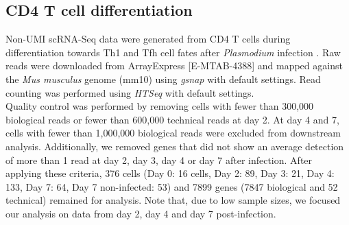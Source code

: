 \subsection{CD4\plus{} T cell differentiation} \label{seq::data_cd4diff}
Non-UMI scRNA-Seq data were generated from CD4\plus{} T cells during differentiation towards Th1 and Tfh cell fates after \emph{Plasmodium} infection \citep{Lonnberg2017}. Raw reads were downloaded from ArrayExpress [E-MTAB-4388] and mapped against the \emph{Mus musculus} genome (mm10) using \emph{gsnap} \citep{Wu2010a} with default settings. Read counting was performed using \emph{HTSeq} \citep{Anders2014} with default settings. \\

Quality control was performed by removing cells with fewer than 300,000 biological reads or fewer than 600,000 technical reads at day 2. At day 4 and 7, cells with fewer than 1,000,000 biological reads were excluded from downstream analysis. Additionally, we removed genes that did not show an average detection of more than 1 read at day 2, day 3, day 4 or day 7 after infection. After applying these criteria, 376 cells (Day 0: 16 cells, Day 2: 89, Day 3: 21, Day 4: 133, Day 7: 64, Day 7 non-infected: 53) and 7899 genes (7847 biological and 52 technical) remained for analysis. Note that, due to low sample sizes, we focused our analysis on data from day 2, day 4 and day 7 post-infection.

\newpage

